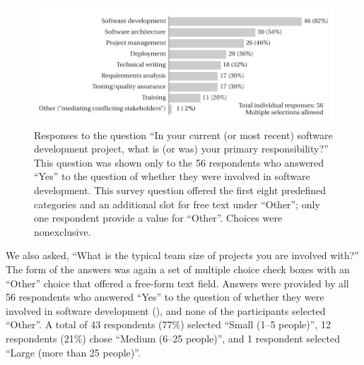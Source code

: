 \documentclass{casicswhitepaper}
\newcommand{\totalDevelopers}{56\xspace}
\begin{document}
\begin{figure}[thb]
  \vspace*{-1ex}
  \centering
  \includegraphics{files/plots/responsibilities.pdf}
  \vspace*{-3ex}
  \caption{Responses to the question  ``In your current (or most recent) software development project, what is (or was) your primary responsibility?''  This question was shown only to the 56 respondents who answered ``Yes'' to the question of whether they were involved in software development.  This survey question offered the first eight predefined categories and an additional slot for free text under ``Other''; only one respondent provide a value for ``Other''.  Choices were nonexclusive.}
  \label{responsibilities}
\end{figure}

We also asked, ``What is the typical team size of projects you are involved with?''  The form of the answers was again a set of multiple choice check boxes with an ``Other'' choice that offered a free-form text field.  Answers were provided by all \totalDevelopers respondents who answered ``Yes'' to the question of whether they were involved in software development (), and none of the participants selected ``Other''.  A total of 43 respondents (77\%) selected ``Small (1--5 people)'', 12 respondents (21\%) chose ``Medium (6--25 people)'', and 1 respondent selected ``Large (more than 25 people)''.


\end{document}
